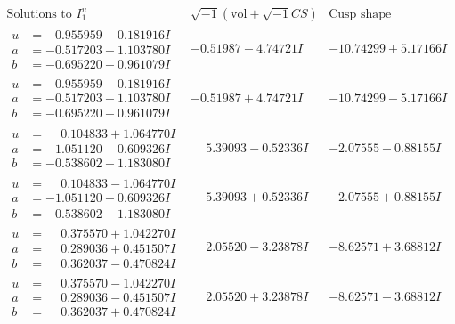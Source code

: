 \documentclass[1p]{elsarticle_modified}
\theoremstyle{definition}
\newcommand{\I}{\sqrt{-1}}
\begin{document}
$$\begin{array}{c|c|c}  
\text{Solutions to }I^u_{1}& \I (\text{vol} + \sqrt{-1}CS) & \text{Cusp shape}\\
 \hline 
\begin{aligned}
u &= -0.955959 + 0.181916 I \\
a &= -0.517203 - 1.103780 I \\
b &= -0.695220 - 0.961079 I\end{aligned}
 & -0.51987 - 4.74721 I & -10.74299 + 5.17166 I \\ \hline\begin{aligned}
u &= -0.955959 - 0.181916 I \\
a &= -0.517203 + 1.103780 I \\
b &= -0.695220 + 0.961079 I\end{aligned}
 & -0.51987 + 4.74721 I & -10.74299 - 5.17166 I \\ \hline\begin{aligned}
u &= \phantom{-}0.104833 + 1.064770 I \\
a &= -1.051120 - 0.609326 I \\
b &= -0.538602 + 1.183080 I\end{aligned}
 & \phantom{-}5.39093 - 0.52336 I & -2.07555 - 0.88155 I \\ \hline\begin{aligned}
u &= \phantom{-}0.104833 - 1.064770 I \\
a &= -1.051120 + 0.609326 I \\
b &= -0.538602 - 1.183080 I\end{aligned}
 & \phantom{-}5.39093 + 0.52336 I & -2.07555 + 0.88155 I \\ \hline\begin{aligned}
u &= \phantom{-}0.375570 + 1.042270 I \\
a &= \phantom{-}0.289036 + 0.451507 I \\
b &= \phantom{-}0.362037 - 0.470824 I\end{aligned}
 & \phantom{-}2.05520 - 3.23878 I & -8.62571 + 3.68812 I \\ \hline\begin{aligned}
u &= \phantom{-}0.375570 - 1.042270 I \\
a &= \phantom{-}0.289036 - 0.451507 I \\
b &= \phantom{-}0.362037 + 0.470824 I\end{aligned}
 & \phantom{-}2.05520 + 3.23878 I & -8.62571 - 3.68812 I \\ \hline\begin{aligned}

\end{aligned}
\end{array}$$
\end{document}
